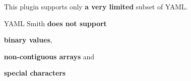 \begin{DoxyItemize}
\item This plugin supports only {\bfseries a very limited} subset of Y\+A\+ML.
\item Y\+A\+ML Smith {\bfseries does not support}
\begin{DoxyItemize}
\item {\bfseries binary values},
\item {\bfseries non-\/contiguous arrays} and
\item {\bfseries special characters}
\end{DoxyItemize}
\end{DoxyItemize}